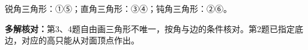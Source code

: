 
\begingroup\color{answerred}锐角三角形：①⑤；直角三角形：③④；钝角三角形：②⑥。\par\endgroup
{}
\begingroup\color{answerred}\par\noindent\begin{center}\end{center}\par\endgroup
{}
\begingroup\color{answerred}\par\noindent\begin{center}\end{center}\par\endgroup
{}
\begingroup\color{answerred}\par\noindent\begin{center}\end{center}\par\endgroup

\begingroup\color{answerred}\textbf{多解核对：}第3、4题自由画三角形不唯一，按角与边的条件核对。第2题已指定底边，对应的高只能从对面顶点作出。\par\endgroup

